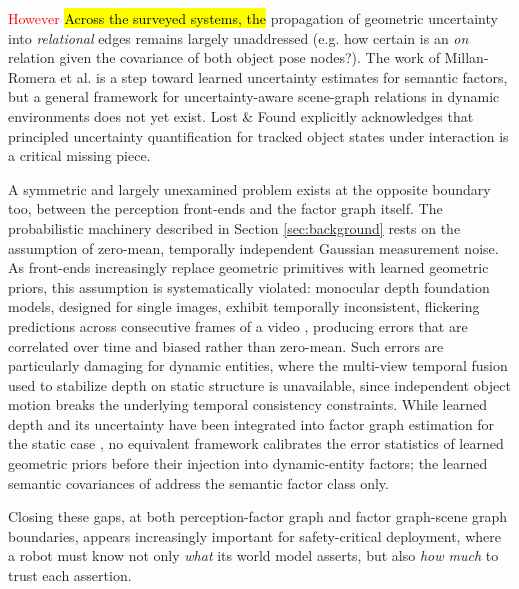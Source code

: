\textcolor{red}{However} \hl{Across the surveyed systems, the} propagation of geometric uncertainty into \textit{relational} edges remains largely unaddressed (e.g. how certain is an \textit{on} relation given the covariance of both object pose nodes?).
The work of Millan-Romera et al. \cite{millanromera2026generationuncertaintyawarehighlevelspatial} is a step toward learned uncertainty estimates for semantic factors, but a general framework for uncertainty-aware scene-graph relations in dynamic environments does not yet exist.
Lost \& Found \cite{behrens_lost_2025} explicitly acknowledges that principled uncertainty quantification for tracked object states under interaction is a critical missing piece. 

A symmetric and largely unexamined problem exists at the opposite boundary too, between the perception front-ends and the factor graph itself.
The probabilistic machinery described in Section \ref{sec:background} rests on the assumption of zero-mean, temporally independent Gaussian measurement noise. 
As front-ends increasingly replace geometric primitives with learned geometric priors, this assumption is systematically violated: monocular depth foundation models, designed for single images, exhibit temporally inconsistent, flickering predictions across consecutive frames of a video \cite{video_depth_anything}, producing errors that are correlated over time and biased rather than zero-mean. 
Such errors are particularly damaging for dynamic entities, where the multi-view temporal fusion used to stabilize depth on static structure \cite{video_depth_anything} is unavailable, since independent object motion breaks the underlying temporal consistency constraints.
While learned depth and its uncertainty have been integrated into factor graph estimation for the static case \cite{bloesch2018codeslam} \cite{yang2020d3vo}, no equivalent framework calibrates the error statistics of learned geometric priors before their injection into dynamic-entity factors; the learned semantic covariances of \cite{millan-romera_learning_2024} address the semantic factor class only.

Closing these gaps, at both perception-factor graph and factor graph-scene graph boundaries, appears increasingly important for safety-critical deployment, where a robot must know not only \textit{what} its world model asserts, but also \textit{how much} to trust each assertion.

